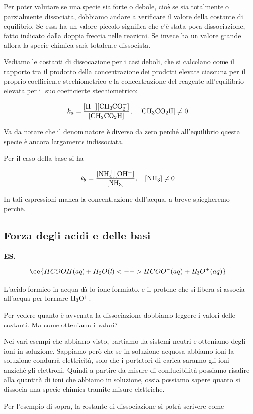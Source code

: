 Per poter valutare se una specie sia forte o debole, cioè se sia totalmente o parzialmente dissociata, dobbiamo andare a verificare il valore della costante di equilibrio. Se essa ha un valore piccolo significa che c'è stata poca dissociazione, fatto indicato dalla doppia freccia nelle reazioni. Se invece ha un valore grande allora la specie chimica sarà totalente dissociata.

\vspace{0.2cm}Vediamo le costanti di dissocazione per i casi deboli, che si calcolano come il rapporto tra il prodotto della concentrazione dei prodotti elevate ciascuna per il proprio coefficiente stechiometrico e la concentrazione del reagente all'equilibrio elevata per il suo coefficiente stechiometrico:

$$k_a=\rm{\frac{[H^+][CH_3CO_2^-]}{[CH_3CO_2H]}}, \quad [CH_3CO_2H] \neq 0$$

Va da notare che il denominatore è diverso da zero perché all'equilibrio questa specie è ancora largamente indissociata.

Per il caso della base si ha

$$k_b=\rm{\frac{[NH_4^+][OH^-]}{[NH_3]}}, \quad [NH_3]\neq 0$$

In tali espressioni manca la concentrazione dell'acqua, a breve spiegheremo perché.
\subsection{Forza degli acidi e delle basi}
\textbf{ES.}

$$\ce{HCOOH(aq) + H_2O(l) <--> HCOO^-(aq) + H_3O^+(aq)}$$

L'acido formico in acqua dà lo ione formiato, e il protone che si libera si associa all'acqua per formare $\rm H_3O^+$.

Per vedere quanto è avvenuta la dissociazione dobbiamo leggere i valori delle costanti. Ma come otteniamo i valori?

Nei vari esempi che abbiamo visto, partiamo da sistemi neutri e otteniamo degli ioni in soluzione. Sappiamo però che se in soluzione acquosa abbiamo ioni la soluzione condurrà elettricità, solo che i portatori di carica saranno gli ioni anziché gli elettroni. Quindi a partire da misure di conducibilità possiamo risalire alla quantità di ioni che abbiamo in soluzione, ossia possiamo sapere quanto si dissocia una specie chimica tramite misure elettriche.

Per l'esempio di sopra, la costante di dissociazione si potrà scrivere come


